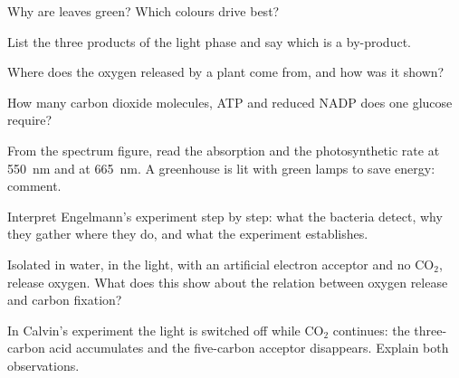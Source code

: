 \begin{exercise}[$\star$]\label{exo:g12:photosynthesis:2}
Why are leaves green? Which colours drive  best?
\end{exercise}

\begin{exercise}[$\star$]\label{exo:g12:photosynthesis:3}
List the three products of the light phase and say which is a
by-product.
\end{exercise}

\begin{exercise}[$\star$]\label{exo:g12:photosynthesis:4}
Where does the oxygen released by a plant come from, and how was it
shown?
\end{exercise}

\begin{exercise}[$\star$]\label{exo:g12:photosynthesis:5}
How many carbon dioxide molecules, ATP and reduced NADP does one
glucose require?
\end{exercise}

\begin{exercise}[$\star\star$]\label{exo:g12:photosynthesis:6}
From the spectrum figure, read the absorption and the photosynthetic
rate at \qty{550}{nm} and at \qty{665}{nm}. A greenhouse is lit with
green lamps to save energy: comment.
\end{exercise}

\begin{exercise}[$\star\star$]\label{exo:g12:photosynthesis:7}
Interpret Engelmann's experiment step by step: what the bacteria
detect, why they gather where they do, and what the experiment
establishes.
\end{exercise}

\begin{exercise}[$\star\star$]\label{exo:g12:photosynthesis:8}
Isolated  in water, in the light, with an artificial
electron acceptor and no $\mathrm{CO_2}$, release oxygen. What does
this show about the relation between oxygen release and carbon
fixation?
\end{exercise}

\begin{exercise}[$\star\star$]\label{exo:g12:photosynthesis:9}
In Calvin's experiment the light is switched off while $\mathrm{CO_2}$
continues: the three-carbon acid accumulates and the five-carbon
acceptor disappears. Explain both observations.
\end{exercise}


